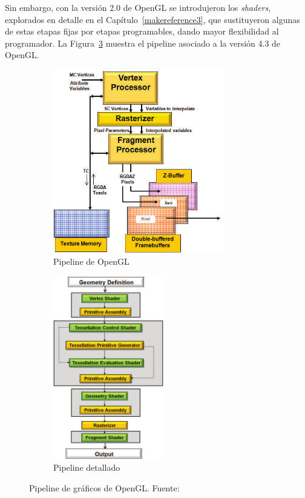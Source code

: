 Sin embargo, con la versión 2.0 de OpenGL se introdujeron los \textit{shaders},
explorados en detalle en el Capítulo~\ref{makereference3}, que sustituyeron
algunas de estas etapas fijas por etapas programables, dando mayor flexibilidad
al programador. La Figura~\ref{fig2.2} muestra el pipeline asociado a la versión
4.3 de OpenGL. 

\begin{figure}[h]%
	\begin{subfigure}[b]{.5\textwidth}
		\centering
		\includegraphics[height=8cm]{figures/pipeline.png}
		\caption{Pipeline de OpenGL}
		\label{fig2.2a}
	\end{subfigure}
	\begin{subfigure}[b]{.5\textwidth}
		\centering
		\includegraphics[height=8cm]{figures/pipelineExtendido.png}
		\caption{Pipeline detallado}
		\label{fig2.2b}
	\end{subfigure}
	\caption[Pipeline de gráficos de OpenGL]
	{Pipeline de gráficos de OpenGL. Fuente:~\cite{Bailey}}
	\label{fig2.2}
\end{figure}

